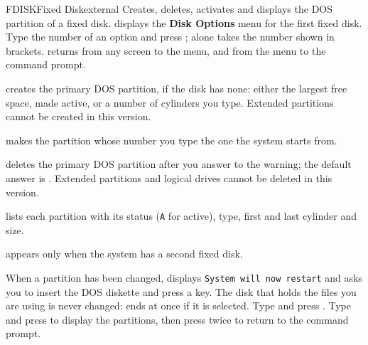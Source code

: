 \begin{DosEntry}{FDISK}{Fixed Disk}{external}
\Purpose Creates, deletes, activates and displays the DOS partition of a
fixed disk.
\Format {}
\Remarks
{} displays the \textbf{Disk Options} menu for the first fixed disk.
Type the number of an option and press ;  alone takes
the number shown in brackets.   returns from any screen to the
menu, and from the menu to the command prompt.

 creates the primary DOS partition, if the
disk has none: either the largest free space, made active, or a number of
cylinders you type.  Extended partitions cannot be created in this version.

 makes the partition whose number you
type the one the system starts from.

 deletes the primary DOS partition after you
answer  to the warning; the default answer is .  Extended
partitions and logical drives cannot be deleted in this version.

 lists each partition with its status
(\texttt{A} for active), type, first and last cylinder and size.

 appears only when the system has a
second fixed disk.

When a partition has been changed,  displays
\texttt{System will now restart} and asks you to insert the DOS diskette and
press a key.  The disk that holds the files you are using is never changed:
 ends at once if it is selected.
\Example
Type  and press .  Type  and press
 to display the partitions, then press  twice to return
to the command prompt.
\end{DosEntry}

